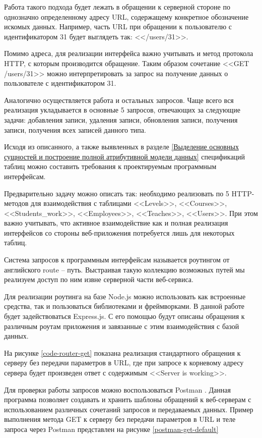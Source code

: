 Работа такого подхода будет лежать в обращении к серверной стороне по однозначно определенному адресу URL, содержащему конкретное обозначение искомых данных.
Например, часть URL при обращении к пользователю с идентификатором 31 будет выглядеть так: <</users/31>>.

Помимо адреса, для реализации интерфейса важно учитывать и метод протокола HTTP, с которым производится обращение.
Таким образом сочетание <<GET /users/31>> можно интерпретировать за запрос на получение данных о пользователе с идентификатором 31.

Аналогично осуществляется работа и остальных запросов.
Чаще всего вся реализация укладывается в основные 5 запросов, отвечающих за следующие задачи: добавления записи, удаления записи, обновления записи, получения записи, получения всех записей данного типа.

Исходя из описанного, а также выявленных в разделе \ref{Выделение основных сущностей и построение полной атрибутивной модели данных} спецификаций таблиц можно составить требования к проектируемым программным интерфейсам.

Предварительно задачу можно описать так: необходимо реализовать по 5 HTTP-методов для взаимодействия с таблицами <<Levels>>, <<Courses>>, <<Students\_work>>, <<Employees>>, <<Teaches>>, <<Users>>.
При этом важно учитывать, что активное взаимодействие как и полная реализация интерфейсов со стороны веб-приложения потребуется лишь для некоторых таблиц.

Система запросов к программным интерфейсам называется роутингом от английского route -- путь.
Выстраивая такую коллекцию возможных путей мы реализуем доступ по ним извне серверной части веб-сервиса.

Для реализации роутинга на базе Node.js можно использовать как встроенные средства, так и пользоваться библиотеками и фреймворками.
В данной работе будет задействоваться Express.js.
С его помощью будут описаны обращения к различным роутам приложения и завязанные с этим взаимодействия с базой данных.

На рисунке \ref{code-router-get} показана реализация стандартного обращения к серверу без передачи параметров в URL, где при запросе к корневому адресу сервера будет произведен ответ с содержимым <<Server is working>>.


Для проверки работы запросов можно воспользоваться Postman \cite{postman}.
Данная программа позволяет создавать и хранить шаблоны обращений к веб-серверам с использованием различных сочетаний запросов и передаваемых данных.
Пример выполнения метода GET к серверу без передачи параметров в URL и теле запроса через Postman представлен на рисунке \ref{postman-get-default}

